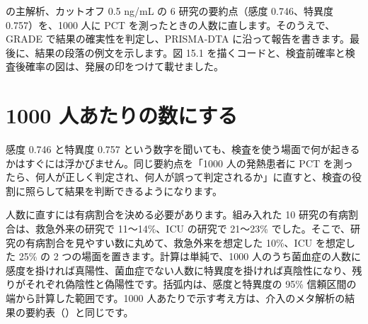 \begin{chapintro}
の主解析、カットオフ 0.5 ng/mL の 6 研究の要約点（感度 0.746、特異度 0.757）を、1000 人に PCT を測ったときの人数に直します。そのうえで、GRADE で結果の確実性を判定し、PRISMA-DTA に沿って報告を書きます。最後に、結果の段落の例文を示します。図 15.1 を描くコードと、検査前確率と検査後確率の図は、発展の印をつけて載せました。
\end{chapintro}

\section{1000 人あたりの数にする}
\label{sec:15-1}

感度 0.746 と特異度 0.757 という数字を聞いても、検査を使う場面で何が起きるかはすぐには浮かびません。同じ要約点を「1000 人の発熱患者に PCT を測ったら、何人が正しく判定され、何人が誤って判定されるか」に直すと、検査の役割に照らして結果を判断できるようになります。

人数に直すには有病割合を決める必要があります。組み入れた 10 研究の有病割合は、救急外来の研究で 11〜14\%、ICU の研究で 21〜23\% でした。そこで、研究の有病割合を見やすい数に丸めて、救急外来を想定した 10\%、ICU を想定した 25\% の 2 つの場面を置きます。計算は単純で、1000 人のうち菌血症の人数に感度を掛ければ真陽性、菌血症でない人数に特異度を掛ければ真陰性になり、残りがそれぞれ偽陰性と偽陽性です。括弧内は、感度と特異度の 95\% 信頼区間の端から計算した範囲です。1000 人あたりで示す考え方は、介入のメタ解析の結果の要約表（）と同じです。

\begin{kkcenter}
\end{kkcenter}

